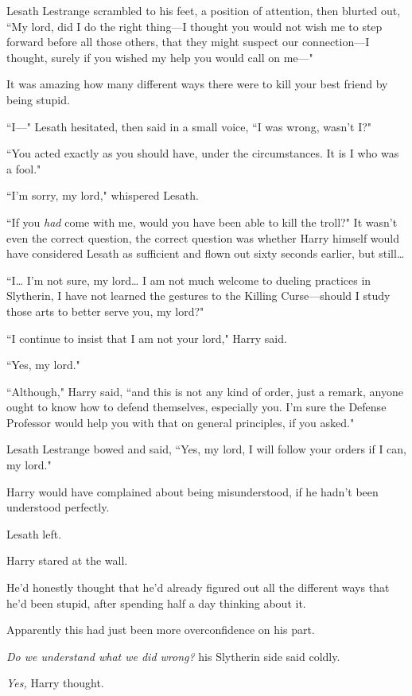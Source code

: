 Lesath Lestrange scrambled to his feet, a position of attention, then blurted out, ``My lord, did I do the right thing—I thought you would not wish me to step forward before all those others, that they might suspect our connection—I thought, surely if you wished my help you would call on me—"

It was amazing how many different ways there were to kill your best friend by being stupid.

``I—" Lesath hesitated, then said in a small voice, ``I was wrong, wasn't I?"

``You acted exactly as you should have, under the circumstances. It is I who was a fool."

``I'm sorry, my lord," whispered Lesath.

``If you \emph{had} come with me, would you have been able to kill the troll?" It wasn't even the correct question, the correct question was whether Harry himself would have considered Lesath as sufficient and flown out sixty seconds earlier, but still{\ldots}

``I{\ldots} I'm not sure, my lord{\ldots} I am not much welcome to dueling practices in Slytherin, I have not learned the gestures to the Killing Curse—should I study those arts to better serve you, my lord?"

``I continue to insist that I am not your lord," Harry said.

``Yes, my lord."

``Although," Harry said, ``and this is not any kind of order, just a remark, anyone ought to know how to defend themselves, especially you. I'm sure the Defense Professor would help you with that on general principles, if you asked."

Lesath Lestrange bowed and said, ``Yes, my lord, I will follow your orders if I can, my lord."

Harry would have complained about being misunderstood, if he hadn't been understood perfectly.

Lesath left.

Harry stared at the wall.

He'd honestly thought that he'd already figured out all the different ways that he'd been stupid, after spending half a day thinking about it.

Apparently this had just been more overconfidence on his part.

\emph{Do we understand what we did wrong?} his Slytherin side said coldly.

\emph{Yes,} Harry thought.

